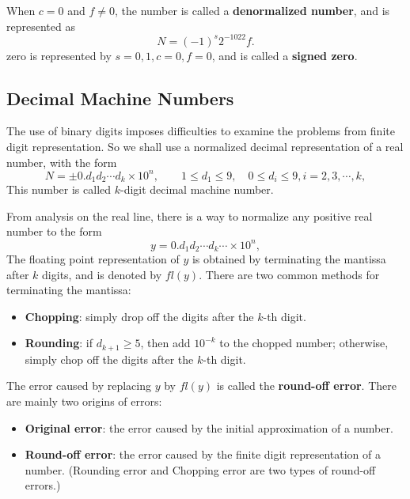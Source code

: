 \documentclass[../main.tex]{subfiles}
\begin{document}
When $c = 0$ and $f \neq 0$, the number is called a \textbf{denormalized number}, and is represented as
\begin{equation}
  N = (-1)^s 2^{-1022} f.
\end{equation}
zero is represented by $s = 0,1, c = 0, f = 0$, and is called a \textbf{signed zero}.

\subsection{Decimal Machine Numbers}
The use of binary digits imposes difficulties to examine the problems from finite digit representation. So we shall use a normalized decimal representation of a real number, with the form
\begin{equation*}
  N = \pm 0.d_1 d_2 \cdots d_k \times 10^n, \qquad 1 \leq d_1 \leq 9, \quad 0 \leq d_i \leq 9, i = 2,3,\cdots,k,
\end{equation*}
This number is called $k$-digit decimal machine number.

From analysis on the real line, there is a way to normalize any positive real number to the form
\begin{equation*}
  y = 0.d_1 d_2 \cdots d_k \cdots \times 10^n, 
\end{equation*}
The floating point representation of $y$ is obtained by terminating the mantissa after $k$ digits, and is denoted by $fl(y)$. There are two common methods for terminating the mantissa:
\begin{itemize}
  \item \textbf{Chopping}: simply drop off the digits after the $k$-th digit.
  \item \textbf{Rounding}: if $d_{k+1} \geq 5$, then add $10^{-k}$ to the chopped number; otherwise, simply chop off the digits after the $k$-th digit.
\end{itemize}

The error caused by replacing $y$ by $fl(y)$ is called the \textbf{round-off error}. There are mainly two origins of errors:
\begin{itemize}
  \item \textbf{Original error}: the error caused by the initial approximation of a number.
  \item \textbf{Round-off error}: the error caused by the finite digit representation of a number. (Rounding error and Chopping error are two types of round-off errors.)
\end{itemize}
\end{document}
